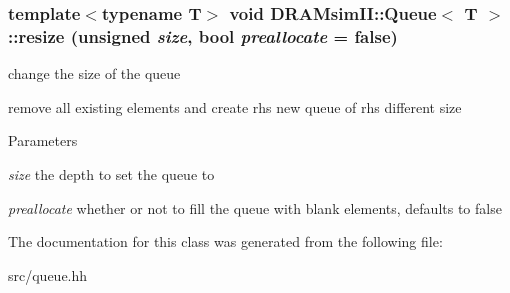 \subsubsection[{resize}]{\setlength{\rightskip}{0pt plus 5cm}template$<$typename T$>$ void {\bf DRAMsimII::Queue}$<$ T $>$::resize (unsigned {\em size}, \/  bool {\em preallocate} = {\ttfamily false})\hspace{0.3cm}{\ttfamily  [inline]}}\label{class_d_r_a_msim_i_i_1_1_queue_aba5258156502bfb99cff932324a71412}


change the size of the queue 

remove all existing elements and create rhs new queue of rhs different size 
\begin{DoxyParams}{Parameters}
\item[{\em size}]the depth to set the queue to \item[{\em preallocate}]whether or not to fill the queue with blank elements, defaults to false \end{DoxyParams}


The documentation for this class was generated from the following file:\begin{DoxyCompactItemize}
\item 
src/queue.hh\end{DoxyCompactItemize}
